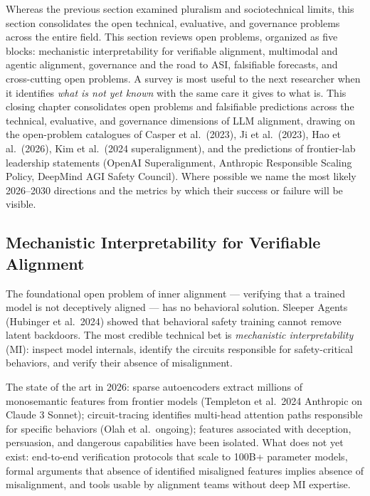 Whereas the previous section examined pluralism and sociotechnical limits, this section consolidates the open technical, evaluative, and governance problems across the entire field. This section reviews open problems, organized as five blocks: mechanistic interpretability for verifiable alignment, multimodal and agentic alignment, governance and the road to ASI, falsifiable forecasts, and cross-cutting open problems. A survey is most useful to the next researcher when it identifies \emph{what is not yet known} with the same care it gives to what is. This closing chapter consolidates open problems and falsifiable predictions across the technical, evaluative, and governance dimensions of LLM alignment, drawing on the open-problem catalogues of Casper et al.~(2023), Ji et al.~(2023), Hao et al.~(2026), Kim et al.~(2024 superalignment), and the predictions of frontier-lab leadership statements (OpenAI Superalignment, Anthropic Responsible Scaling Policy, DeepMind AGI Safety Council). Where possible we name the most likely 2026--2030 directions and the metrics by which their success or failure will be visible.

\subsection{Mechanistic Interpretability for Verifiable Alignment}\label{mechanistic-interpretability-for-verifiable-alignment}

The foundational open problem of inner alignment --- verifying that a trained model is not deceptively aligned --- has no behavioral solution. Sleeper Agents (Hubinger et al.~2024) showed that behavioral safety training cannot remove latent backdoors. The most credible technical bet is \emph{mechanistic interpretability} (MI): inspect model internals, identify the circuits responsible for safety-critical behaviors, and verify their absence of misalignment.

The state of the art in 2026: sparse autoencoders extract millions of monosemantic features from frontier models (Templeton et al.~2024 Anthropic on Claude 3 Sonnet); circuit-tracing identifies multi-head attention paths responsible for specific behaviors (Olah et al.~ongoing); features associated with deception, persuasion, and dangerous capabilities have been isolated. What does not yet exist: end-to-end verification protocols that scale to 100B+ parameter models, formal arguments that absence of identified misaligned features implies absence of misalignment, and tools usable by alignment teams without deep MI expertise.


